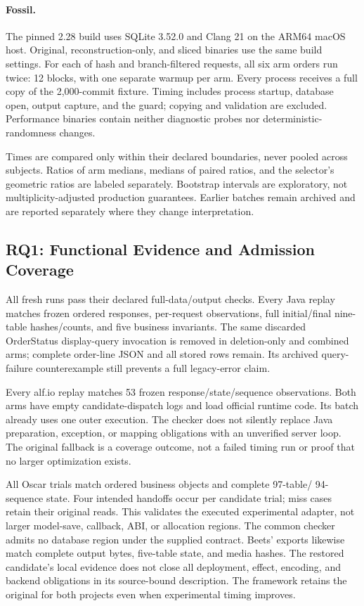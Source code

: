 \documentclass[acmsmall,screen,review,anonymous]{acmart}
\begin{document}
\paragraph{Fossil.}
The pinned 2.28 build uses SQLite 3.52.0 and Clang 21 on the ARM64 macOS host.
Original, reconstruction-only, and sliced binaries use the same build settings.
For each of hash and branch-filtered requests, all six arm orders run twice:
12 blocks, with one separate warmup per arm. Every process receives a full
copy of the 2,000-commit fixture. Timing includes process startup, database open,
output capture, and the guard; copying and validation are excluded. Performance
binaries contain neither diagnostic probes nor deterministic-randomness changes.

Times are compared only within their declared boundaries, never pooled across
subjects. Ratios of arm medians, medians of paired ratios, and the selector's
geometric ratios are labeled separately. Bootstrap intervals are exploratory,
not multiplicity-adjusted production guarantees. Earlier batches remain archived
and are reported separately where they change interpretation.

\subsection{RQ1: Functional Evidence and Admission Coverage}
All fresh runs pass their declared full-data/output checks. Every Java replay
matches frozen ordered responses, per-request observations, full initial/final
nine-table hashes/counts, and five business invariants. The same discarded
OrderStatus display-query invocation is removed in deletion-only and combined
arms; complete order-line JSON and all stored rows remain. Its archived
query-failure counterexample still prevents a full legacy-error claim.

Every alf.io replay matches 53 frozen response/state/sequence observations.
Both arms have empty candidate-dispatch logs and load official runtime code.
Its batch already uses one outer execution. The checker does not silently
replace Java preparation, exception, or mapping obligations with an unverified
server loop. The original fallback is a coverage outcome, not a failed timing
run or proof that no larger optimization exists.

All Oscar trials match ordered business objects and complete 97-table/
94-sequence state. Four intended handoffs occur per candidate trial; miss cases
retain their original reads. This validates the executed experimental adapter,
not larger model-save, callback, ABI, or allocation regions. The common checker
admits no database region under the supplied contract. Beets' exports likewise
match complete output bytes, five-table state, and media hashes. The restored
candidate's local evidence does not close all deployment, effect, encoding,
and backend obligations in its source-bound description. The framework retains
the original for both projects even when experimental timing improves.
\end{document}
